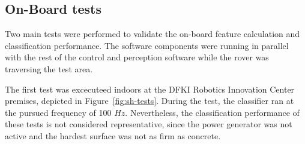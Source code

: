 

\subsection{On-Board tests}

Two main tests were performed to validate the on-board feature calculation and classification performance. The software components were running in parallel with the rest of the control and perception software while the rover was traversing
the test area.

The first test was excecuteed indoors at the DFKI Robotics Innovation Center premises, depicted in Figure~\ref{fig:sh-tests}.
During the test, the classifier ran at the pursued frequency of 100 $Hz$.
Nevertheless, the classification performance of these tests is not considered representative, since the power generator was not active and the hardest surface was not as firm as concrete. 

